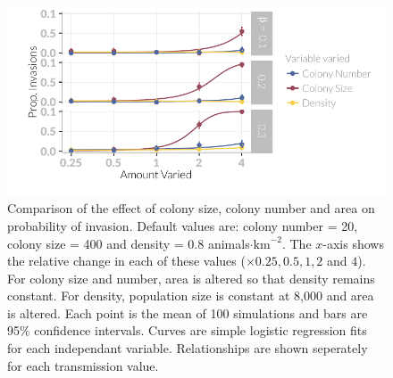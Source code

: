 \begin{knitrout}\footnotesize
{}\color{fgcolor}\begin{figure}[t]

{\centering \includegraphics[width=\textwidth]{figure/plotValueChangeMeans-1} 

}

\caption[Comparison of the probability of invasion when population size is altered by changing colony size or colony number.]{
Comparison of the effect of colony size, colony number and area on probability of invasion.
Default values are: colony number = 20, colony size = 400 and density = 0.8 animals$\cdot\text{km}^{-2}$.
The $x$-axis shows the relative change in each of these values ($\times 0.25, 0.5, 1, 2$ and $4$).
For colony size and number, area is altered so that density remains constant.
For density, population size is constant at 8,000 and area is altered.
Each point is the mean of 100 simulations and bars are 95\% confidence intervals.
Curves are simple logistic regression fits for each independant variable.
Relationships are shown seperately for each transmission value.
}\label{fig:plotValueChangeMeans}
\end{figure}


\end{knitrout}







